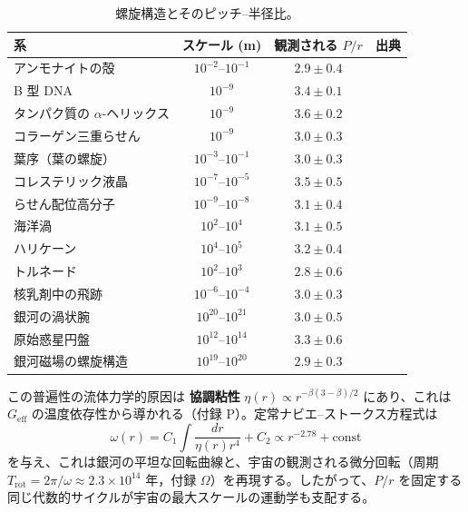 \documentclass[11pt,a4paper]{article}
\begin{document}
	\begin{table}[H]
		\centering
		\caption{螺旋構造とそのピッチ–半径比。}
		\label{tab:spiral-examples}
		\small
		\begin{tabular}{@{}l c c c@{}}
			\toprule
			\textbf{系} & \textbf{スケール (m)} & \textbf{観測される \(P/r\)} & \textbf{出典} \\
			\midrule
			アンモナイトの殻 & \(10^{-2}\)--\(10^{-1}\) & \(2.9 \pm 0.4\) & \cite{ammonites} \\
			B 型 DNA & \(10^{-9}\) & \(3.4 \pm 0.1\) & \cite{watsoncrick} \\
			タンパク質の \(\alpha\)-ヘリックス & \(10^{-9}\) & \(3.6 \pm 0.2\) & \cite{pauling} \\
			コラーゲン三重らせん & \(10^{-9}\) & \(3.0 \pm 0.3\) & \cite{collagen} \\
			葉序（葉の螺旋） & \(10^{-3}\)--\(10^{-1}\) & \(3.0 \pm 0.3\) & \cite{phyllotaxis} \\
			コレステリック液晶 & \(10^{-7}\)--\(10^{-5}\) & \(3.5 \pm 0.5\) & \cite{cholesteric} \\
			らせん配位高分子 & \(10^{-9}\)--\(10^{-8}\) & \(3.1 \pm 0.4\) & \cite{helical-mof} \\
			海洋渦 & \(10^{2}\)--\(10^{4}\) & \(3.1 \pm 0.5\) & \cite{ocean-eddies} \\
			ハリケーン & \(10^{4}\)--\(10^{5}\) & \(3.2 \pm 0.4\) & \cite{hurricanes} \\
			トルネード & \(10^{2}\)--\(10^{3}\) & \(2.8 \pm 0.6\) & \cite{tornadoes} \\
			核乳剤中の飛跡 & \(10^{-6}\)--\(10^{-4}\) & \(3.0 \pm 0.3\) & \cite{nuclear-tracks} \\
			銀河の渦状腕 & \(10^{20}\)--\(10^{21}\) & \(3.0 \pm 0.5\) & \cite{binney-tremaine} \\
			原始惑星円盤 & \(10^{12}\)--\(10^{14}\) & \(3.3 \pm 0.6\) & \cite{ppdisk} \\
			銀河磁場の螺旋構造 & \(10^{19}\)--\(10^{20}\) & \(2.9 \pm 0.3\) & \cite{beck} \\
			\bottomrule
		\end{tabular}
	\end{table}
	
	この普遍性の流体力学的原因は \textbf{協調粘性} \(\eta(r) \propto r^{-\beta(3-\beta)/2}\) にあり、これは \(G_{\mathrm{eff}}\) の温度依存性から導かれる（付録 P）。定常ナビエ–ストークス方程式は
	\[
	\omega(r) = C_1 \int \frac{dr}{\eta(r) r^4} + C_2 \propto r^{-2.78} + \text{const}
	\]
	を与え、これは銀河の平坦な回転曲線と、宇宙の観測される微分回転（周期 \(T_{\mathrm{rot}} = 2\pi/\omega \approx 2.3\times10^{14}\) 年，付録 \(\Omega\)）を再現する。したがって、\(P/r\) を固定する同じ代数的サイクルが宇宙の最大スケールの運動学も支配する。
	
\end{document}
